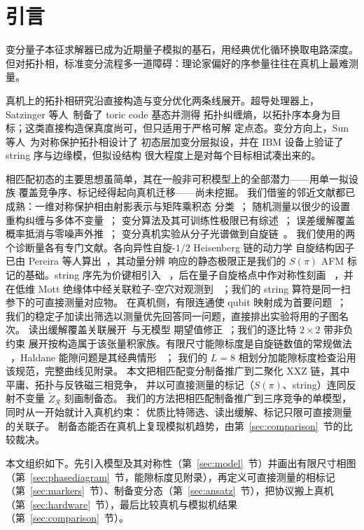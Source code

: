\section{引言}
\label{sec:intro}

变分量子本征求解器已成为近期量子模拟的基石，用经典优化循环换取电路深度。
但对拓扑相，标准变分流程多一道障碍：理论家偏好的序参量往往在真机上最难测量。

真机上的拓扑相研究沿直接构造与变分优化两条线展开。超导处理器上，
Satzinger 等人~\cite{satzinger2021realizing}制备了 toric code 基态并测得
拓扑纠缠熵，以拓扑序本身为目标；这类直接构造保真度尚可，但只适用于严格可解
定点态。变分方向上，Sun 等人~\cite{sun2023efficient}为对称保护拓扑相设计了
初态层加变分层拟设，并在 IBM 设备上验证了 string 序与边缘模，但拟设结构
很大程度上是对每个目标相试凑出来的。

相匹配初态的主要思想虽简单，其在一般非可积模型上的全部潜力——用单一拟设族
覆盖竞争序、标记经得起向真机迁移——尚未挖掘。
我们借鉴的邻近文献都已成熟：一维对称保护相由射影表示与矩阵乘积态
分类~\cite{chen2011classification,schuch2011classifying}；
随机测量以很少的设置重构纠缠与多体不变量~\cite{huang2020predicting,elben2022toolbox}；
变分算法及其可训练性极限已有综述~\cite{cerezo2021variational,tilly2022variational,mcclean2018barren}；
误差缓解覆盖概率抵消与零噪声外推~\cite{temme2017error,kandala2019error}；
变分真机实验从分子光谱做到自旋链~\cite{colless2018robust,yu2023simulating}。
我们使用的两个诊断量各有专门文献。各向异性自旋-$1/2$ Heisenberg 链的动力学
自旋结构因子已由 Pereira 等人算出~\cite{pereira2006dynamical}，其动量分辨
响应的静态极限正是我们的 $S(\pi)$ AFM 标记的基础。string 序先为价键相引入
~\cite{dennijs1989preroughening}，后在量子自旋格点中作对称性刻画
~\cite{perezgarcia2008string}，并在低维 Mott 绝缘体中经关联粒子-空穴对观测到
~\cite{endres2011observation}；我们的 string 算符是同一扫参下的可直接测量对应物。
在真机侧，有限连通使 qubit 映射成为首要问题~\cite{li2019tackling}；
我们的稳定子加读出筛选以测量优先回答同一问题，直接排出实验将用的子图名次。
读出缓解覆盖关联展开~\cite{bravyi2021mitigating,nation2021scalable}与无模型
期望值修正~\cite{vandenberg2022modelfree}；我们的逐比特 $2\times2$ 带非负约束
展开按构造属于该张量积家族。有限尺寸能隙标度是自旋链数值的常规做法
~\cite{sandvik2010computational}，Haldane 能隙问题是其经典情形
~\cite{haldane1983nonlinear,affleck1987rigorous,affleck1989quantum}；
我们的 $L=8$ 相划分加能隙标度检查沿用该规范，完整曲线见附录。
本文把相匹配变分制备推广到二聚化 XXZ 链，其中平庸、拓扑与反铁磁三相竞争，
并以可直接测量的标记（$S(\pi)$、string）连同反射不变量
$\tilde{Z}_{\mathcal R}$ 刻画制备态。
我们的方法把相匹配制备推广到三序竞争的单模型，同时从一开始就计入真机约束：
优质比特筛选、读出缓解、标记只限可直接测量的关联子。
制备态能否在真机上复现模拟机趋势，由第~\ref{sec:comparison}~节的比较裁决。

本文组织如下。先引入模型及其对称性（第~\ref{sec:model}~节）并画出有限尺寸相图
（第~\ref{sec:phasediagram}~节，能隙标度见附录），再定义可直接测量的相标记
（第~\ref{sec:markers}~节）、制备变分态（第~\ref{sec:ansatz}~节），把协议搬上真机
（第~\ref{sec:hardware}~节），最后比较真机与模拟机结果（第~\ref{sec:comparison}~节）。
